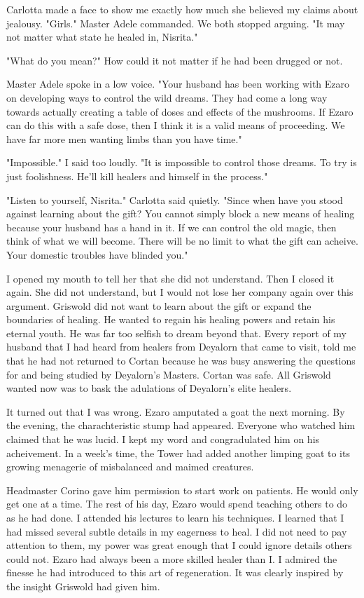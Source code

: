 \documentclass{article}
\begin{document}
Carlotta made a face to show me exactly how much she believed my claims about jealousy. "Girls." Master Adele commanded. We both stopped arguing. "It may not matter what state he healed in, Nisrita." 

"What do you mean?" How could it not matter if he had been drugged or not.

Master Adele spoke in a low voice. "Your husband has been working with Ezaro on developing ways to control the wild dreams. They had come a long way towards actually creating a table of doses and effects of the mushrooms. If Ezaro can do this with a safe dose, then I think it is a valid means of proceeding. We have far more men wanting limbs than you have time."

"Impossible." I said too loudly. "It is impossible to control those dreams. To try is just foolishness. He'll kill healers and himself in the process."

"Listen to yourself, Nisrita." Carlotta said quietly. "Since when have you stood against learning about the gift? You cannot simply block a new means of healing  because your husband has a hand in it. If we can control the old magic, then think of what we will become. There will be no limit to what the gift can acheive. Your domestic troubles have blinded you."

I opened my mouth to tell her that she did not understand. Then I closed it again. She did not understand, but I would not lose her company again over this argument. Griswold did not want to learn about the gift or expand the boundaries of healing. He wanted to regain his healing powers and retain his eternal youth. He was far too selfish to dream beyond that. Every report of my husband that I had heard from healers from Deyalorn that came to visit, told me that he had not returned to Cortan because he was busy answering the questions for and being studied by Deyalorn's Masters. Cortan was safe. All Griswold wanted now was to bask the adulations of Deyalorn's elite healers.

It turned out that I was wrong. Ezaro amputated a goat the next morning. By the evening, the charachteristic stump had appeared. Everyone who watched him claimed that he was lucid. I kept my word and congradulated him on his acheivement. In a week's time, the Tower had added another limping goat to its growing menagerie of misbalanced and maimed creatures. 

Headmaster Corino gave him permission to start work on patients. He would only get one at a time. The rest of his day, Ezaro would spend teaching others to do as he had done. I attended his lectures to learn his techniques. I learned that I had missed several subtle details in my eagerness to heal. I did not need to pay attention to them, my power was great enough that I could ignore details others could not. Ezaro had always been a more skilled healer than I. I admired the finesse he had introduced to this art of regeneration. It was clearly inspired by the insight Griswold had given him.
\end{document}
